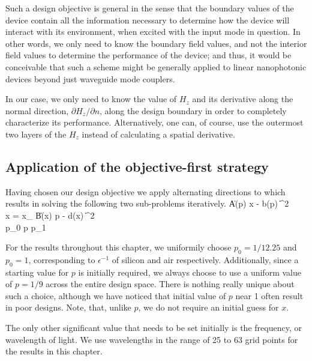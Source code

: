 
Such a design objective is general
    in the sense that the boundary values of the device 
    contain all the information necessary to determine
    how the device will interact with its environment,
    when excited with the input mode in question.
In other words,
    we only need to know the boundary field values,
    and not the interior field values to determine 
    the performance of the device;
    and thus, it would be conceivable that such a scheme
    might be generally applied to linear nanophotonic devices beyond 
    just waveguide mode couplers.

In our case,
    we only need to know the value of $H_z$ and 
    its derivative along the normal direction, $\partial H_z / \partial n$,
    along the design boundary
    in order to completely characterize its performance.
Alternatively,
    one can, of course, use the outermost two layers of the $H_z$
    instead of calculating a spatial derivative.

\subsection{Application of the objective-first strategy}
Having chosen our design objective we apply
    alternating directions to  which 
    results in solving the following two sub-problems iteratively.
\BA {} \| A(p) x - b(p) \|^2 \\
    \subto x = x_  \notag \EA
\BA {} \| B(x) p - d(x) \|^2 \\
    \subto p_0 \le p \le p_1 \notag \EA

For the results throughout this chapter, 
    we uniformily choose $p_0 = 1/12.25$ and $p_0 = 1$,
    corresponding to $\epsilon^{-1}$ of silicon and air respectively.
Additionally, since a starting value for $p$ is initially required,
    we always choose to use a uniform value of $p = 1/9$ 
    across the entire design space.
There is nothing really unique about such a choice,
    although we have noticed that initial value of $p$ near 1 
    often result in poor designs.
Note, that, unlike $p$, we do not require an initial guess for $x$.

The only other significant value that needs to be set initially
    is the frequency, or wavelength of light.
We use wavelengths in the range of 25 to 63 grid points for
    the results in this chapter.

